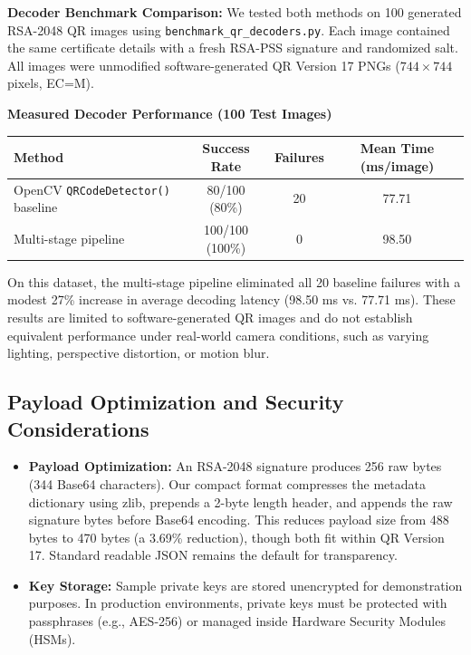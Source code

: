 \documentclass[10pt,a4paper]{article}
\begin{document}
\noindent \textbf{Decoder Benchmark Comparison:} We tested both methods on 100 generated RSA-2048 QR images using \texttt{benchmark\_qr\_decoders.py}. Each image contained the same certificate details with a fresh RSA-PSS signature and randomized salt. All images were unmodified software-generated QR Version 17 PNGs ($744 \times 744$ pixels, EC=M).
\begin{center}
\small
\textbf{Measured Decoder Performance (100 Test Images)}\par
\begin{tabular}{l c c c}
\toprule
\textbf{Method} & \textbf{Success Rate} & \textbf{Failures} & \textbf{Mean Time (ms/image)} \\
\midrule
OpenCV \texttt{QRCodeDetector()} baseline & 80/100 (80\%) & 20 & 77.71 \\
Multi-stage pipeline & 100/100 (100\%) & 0 & 98.50 \\
\bottomrule
\end{tabular}
\end{center}
\noindent On this dataset, the multi-stage pipeline eliminated all 20 baseline failures with a modest 27\% increase in average decoding latency (98.50 ms vs. 77.71 ms). These results are limited to software-generated QR images and do not establish equivalent performance under real-world camera conditions, such as varying lighting, perspective distortion, or motion blur.

\subsection{Payload Optimization and Security Considerations}
\begin{itemize}
    \setlength{\itemsep}{0pt}
    \setlength{\parskip}{0pt}
    \item \textbf{Payload Optimization:} An RSA-2048 signature produces 256 raw bytes (344 Base64 characters). Our compact format compresses the metadata dictionary using zlib, prepends a 2-byte length header, and appends the raw signature bytes before Base64 encoding. This reduces payload size from 488 bytes to 470 bytes (a 3.69\% reduction), though both fit within QR Version 17. Standard readable JSON remains the default for transparency.
    \item \textbf{Key Storage:} Sample private keys are stored unencrypted for demonstration purposes. In production environments, private keys must be protected with passphrases (e.g., AES-256) or managed inside Hardware Security Modules (HSMs).
\end{itemize}
\end{document}
